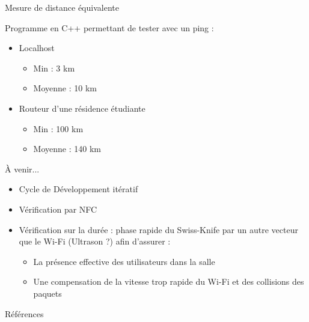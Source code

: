 \documentclass[aspectratio=169]{beamer}
\begin{document}
\begin{frame}{Mesure de distance équivalente}
        
    Programme en C++ permettant de tester avec un ping :
    \begin{itemize}
        \item Localhost
        \begin{itemize}
            \item Min : 3 km
            \item Moyenne : 10 km
        \end{itemize}
        \item Routeur d'une résidence étudiante
        \begin{itemize}
            \item Min : 100 km
            \item Moyenne : 140 km
        \end{itemize}
    \end{itemize}

\end{frame}

\begin{frame}{À venir...}
    
    \begin{itemize}
        \item Cycle de Développement itératif
        \item Vérification par NFC    
        \item Vérification sur la durée : phase rapide du Swiss-Knife par un autre vecteur que le Wi-Fi (Ultrason ?) afin d'assurer :
        \begin{itemize}
            \item La présence effective des utilisateurs dans la salle
            \item Une compensation de la vitesse trop rapide du Wi-Fi et des collisions des paquets
        \end{itemize}

    \end{itemize}

    
\end{frame}

\begin{frame}{Références}
  \printbibliography
\end{frame}
\end{document}
